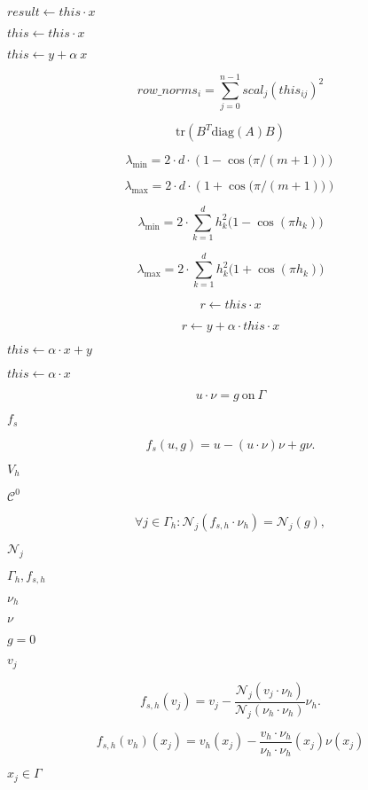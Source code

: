 \documentclass{article}
\begin{document}
$result \leftarrow this \cdot x$
\pagebreak

$this \leftarrow this \cdot x$
\pagebreak

$this \leftarrow y + \alpha~ x$
\pagebreak

\[
   row\_norms_i = \sum_{j=0}^{n-1} scal_j (this_{ij})^2
\]
\pagebreak

\[
  \mathrm{tr}(B^T \mathrm{diag}(A) B)
\]
\pagebreak

\[ \lambda_{\min} = 2 \cdot d \cdot (1 - \cos\big(\pi/(m+1)\big) ) \]
\pagebreak

\[ \lambda_{\max} = 2 \cdot d \cdot (1 + \cos\big(\pi/(m+1)\big) ) \]
\pagebreak

\[ \lambda_{\min} = 2 \cdot \sum^d_{k=1} h_k^2 \big(1 - \cos(\pi h_k) \big) \]
\pagebreak

\[ \lambda_{\max} = 2 \cdot \sum^d_{k=1} h_k^2 \big(1 + \cos(\pi h_k) \big) \]
\pagebreak

\[r \leftarrow this\cdot x \]
\pagebreak

\[r \leftarrow y + \alpha\cdot this\cdot x \]
\pagebreak

$ this \leftarrow \alpha\cdot x + y $
\pagebreak

$ this \leftarrow \alpha\cdot x $
\pagebreak

\[ u \cdot \nu = g ~\mathrm{on}~ \Gamma \]
\pagebreak

$ f_s $
\pagebreak

\[ f_s(u,g) = u - (u \cdot \nu) \nu + g \nu. \]
\pagebreak

$ V_h $
\pagebreak

$ \mathcal{C}^0 $
\pagebreak

\[ \forall j \in \Gamma_h: \mathcal{N}_j(f_{s,h} \cdot \nu_h) = \mathcal{N}_j(g), \]
\pagebreak

$ \mathcal{N}_j $
\pagebreak

$ \Gamma_h, f_{s,h} $
\pagebreak

$ \nu_h $
\pagebreak

$ \nu $
\pagebreak

$ g = 0 $
\pagebreak

$v_j$
\pagebreak

\[ f_{s,h}(v_j) = v_j - \frac{\mathcal{N}_j(v_j \cdot \nu_h)}{\mathcal{N}_j (\nu_h \cdot \nu_h)} \nu_h. \]
\pagebreak

\[ f_{s,h}(v_h)(x_j) = v_h(x_j) - \frac{v_h \cdot \nu_h}{\nu_h \cdot \nu_h}(x_j) \nu(x_j) \]
\pagebreak

$ x_j \in \Gamma $
\pagebreak
\end{document}
